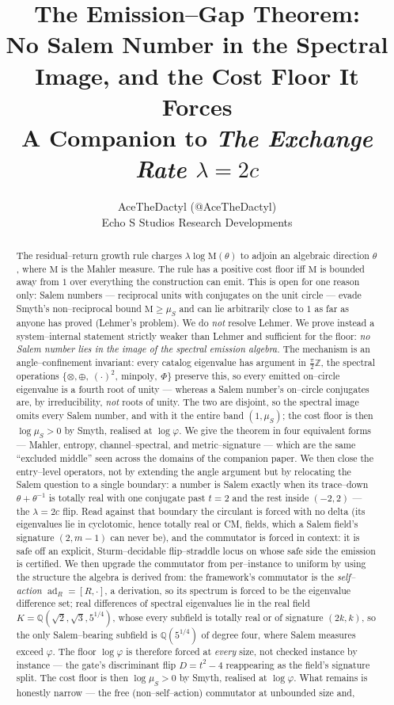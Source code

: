 \documentclass[11pt]{article}
\title{\textbf{The Emission--Gap Theorem:}\\[2pt]
\large No Salem Number in the Spectral Image, and the Cost Floor It Forces\\[6pt]
\normalsize A Companion to \emph{The Exchange Rate $\lambda = 2c$}}
\author{AceTheDactyl (@AceTheDactyl)\\ Echo S Studios Research Developments}
\date{}
\theoremstyle{plain}
\theoremstyle{definition}
\theoremstyle{remark}
\newcommand{\Q}{\mathbb{Q}}
\newcommand{\Z}{\mathbb{Z}}
\newcommand{\Mah}{\mathrm{M}}
\begin{document}
\maketitle

\begin{abstract}
The residual--return growth rule charges $\lambda\log\Mah(\theta)$ to adjoin an algebraic direction $\theta$, where $\Mah$ is the Mahler measure. The rule has a positive cost floor iff $\Mah$ is bounded away from $1$ over everything the construction can emit. This is open for one reason only: Salem numbers --- reciprocal units with conjugates on the unit circle --- evade Smyth's non--reciprocal bound $\Mah\ge\mu_S$ and can lie arbitrarily close to $1$ as far as anyone has proved (Lehmer's problem). We do \emph{not} resolve Lehmer. We prove instead a system--internal statement strictly weaker than Lehmer and sufficient for the floor: \emph{no Salem number lies in the image of the spectral emission algebra.} The mechanism is an angle--confinement invariant: every catalog eigenvalue has argument in $\tfrac\pi2\Z$, the spectral operations $\{\otimes,\oplus,\ (\cdot)^2,\ \text{minpoly},\ \Phi\}$ preserve this, so every emitted on--circle eigenvalue is a fourth root of unity --- whereas a Salem number's on--circle conjugates are, by irreducibility, \emph{not} roots of unity. The two are disjoint, so the spectral image omits every Salem number, and with it the entire band $(1,\mu_S)$; the cost floor is then $\log\mu_S>0$ by Smyth, realised at $\log\varphi$. We give the theorem in four equivalent forms --- Mahler, entropy, channel--spectral, and metric--signature --- which are the same ``excluded middle'' seen across the domains of the companion paper. We then close the entry--level operators, not by extending the angle argument but by relocating the Salem question to a single boundary: a number is Salem exactly when its trace--down $\theta+\theta^{-1}$ is totally real with one conjugate past $t=2$ and the rest inside $(-2,2)$ --- the $\lambda=2c$ flip. Read against that boundary the circulant is forced with no delta (its eigenvalues lie in cyclotomic, hence totally real or CM, fields, which a Salem field's signature $(2,m-1)$ can never be), and the commutator is forced in context: it is safe off an explicit, Sturm--decidable flip--straddle locus on whose safe side the emission is certified. We then upgrade the commutator from per--instance to uniform by using the structure the algebra is derived from: the framework's commutator is the \emph{self--action} $\operatorname{ad}_R=[R,\cdot]$, a derivation, so its spectrum is forced to be the eigenvalue difference set; real differences of spectral eigenvalues lie in the real field $K=\Q(\sqrt2,\sqrt3,5^{1/4})$, whose every subfield is totally real or of signature $(2k,k)$, so the only Salem--bearing subfield is $\Q(5^{1/4})$ of degree four, where Salem measures exceed $\varphi$. The floor $\log\varphi$ is therefore forced at \emph{every} size, not checked instance by instance --- the gate's discriminant flip $D=t^2-4$ reappearing as the field's signature split. The cost floor is then $\log\mu_S>0$ by Smyth, realised at $\log\varphi$. What remains is honestly narrow --- the free (non--self--action) commutator at unbounded size and, 
\end{abstract}
\end{document}
